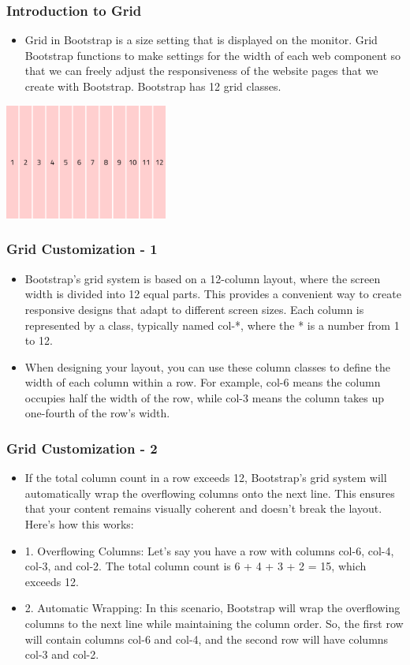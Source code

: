 \documentclass[aspectratio=169, table]{beamer}
\begin{document}
\begin{frame}
    \frametitle{Introduction to Grid}
    \vskip1cm
    \begin{itemize}
        \item Grid in Bootstrap is a size setting that is displayed on the monitor. Grid Bootstrap functions to make settings for the width of each web component so that we can freely adjust the responsiveness of the website pages that we create with Bootstrap. Bootstrap has 12 grid classes.
    \end{itemize}
    \begin{center}
	\includegraphics[width=0.4\textwidth]{classFiles/grid-general.jpg}
    \end{center}
\end{frame}


\begin{frame}
    \frametitle{Grid Customization - 1}
    \vskip0cm
    \begin{itemize}
        \item Bootstrap's grid system is based on a 12-column layout, where the screen width is divided into 12 equal parts. This provides a convenient way to create responsive designs that adapt to different screen sizes. Each column is represented by a class, typically named col-*, where the * is a number from 1 to 12.
	\item When designing your layout, you can use these column classes to define the width of each column within a row. For example, col-6 means the column occupies half the width of the row, while col-3 means the column takes up one-fourth of the row's width.
    \end{itemize}
\end{frame}

\begin{frame}
    \frametitle{Grid Customization - 2}
    \vskip1cm
    \begin{itemize}
        \item If the total column count in a row exceeds 12, Bootstrap's grid system will automatically wrap the overflowing columns onto the next line. This ensures that your content remains visually coherent and doesn't break the layout. Here's how this works:
	\item 1. Overflowing Columns: Let's say you have a row with columns col-6, col-4, col-3, and col-2. The total column count is 6 + 4 + 3 + 2 = 15, which exceeds 12.
	\item 2. Automatic Wrapping: In this scenario, Bootstrap will wrap the overflowing columns to the next line while maintaining the column order. So, the first row will contain columns col-6 and col-4, and the second row will have columns col-3 and col-2.
    \end{itemize}
\end{frame}
\end{document}
